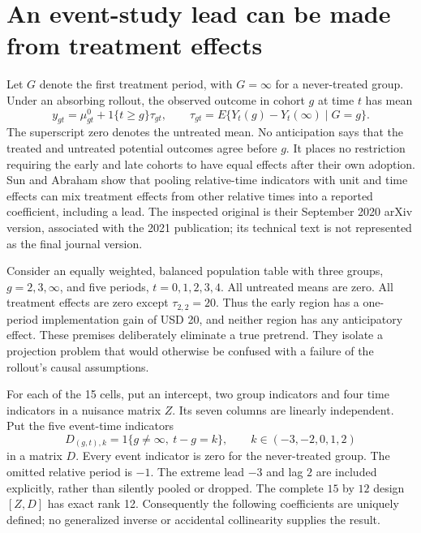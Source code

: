 \section{An event-study lead can be made from treatment effects}
\label{exec17:s6-event}

Let $G$ denote the first treatment period, with $G=\infty$ for a never-treated
group. Under an absorbing rollout, the observed outcome in cohort $g$ at time
$t$ has mean
\begin{equation}
 y_{gt}=\mu_{gt}^{0}+1\{t\geq g\}\tau_{gt},
 \qquad \tau_{gt}=E\{Y_t(g)-Y_t(\infty)\mid G=g\}.
 \label{exec17:s6-cohort-law}
\end{equation}
The superscript zero denotes the untreated mean. No anticipation says that
the treated and untreated potential outcomes agree before $g$. It places no
restriction requiring the early and late cohorts to have equal effects after
their own adoption. Sun and Abraham show that pooling relative-time
indicators with unit and time effects can mix treatment effects from other
relative times into a reported coefficient, including a lead. The inspected
original is their September 2020 arXiv version, associated with the 2021
publication; its technical text is not represented as the final journal
version.~\citep{sun2021}

Consider an equally weighted, balanced population table with three groups,
$g=2,3,\infty$, and five periods, $t=0,1,2,3,4$. All untreated means are zero.
All treatment effects are zero except $\tau_{2,2}=20$. Thus the early region
has a one-period implementation gain of USD 20, and neither region has any
anticipatory effect. These premises deliberately eliminate a true pretrend.
They isolate a projection problem that would otherwise be confused with a
failure of the rollout's causal assumptions.

For each of the 15 cells, put an intercept, two group indicators and four
time indicators in a nuisance matrix $Z$. Its seven columns are linearly
independent. Put the five event-time indicators
\begin{equation}
 D_{(g,t),k}=1\{g\ne\infty,\ t-g=k\},
 \qquad k\in(-3,-2,0,1,2)
 \label{exec17:s6-design}
\end{equation}
in a matrix $D$. Every event indicator is zero for the never-treated group.
The omitted relative period is $-1$. The extreme lead $-3$ and lag $2$
are included explicitly, rather than silently pooled or dropped. The complete
$15$ by $12$ design $[Z,D]$ has exact rank 12. Consequently the following
coefficients are uniquely defined; no generalized inverse or accidental
collinearity supplies the result.

